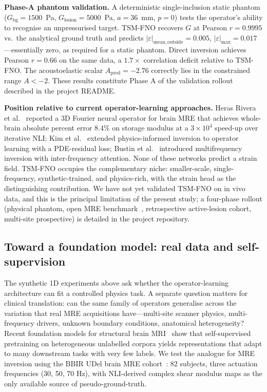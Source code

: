 \documentclass[11pt,letterpaper]{article}
\newcommand{\Gbg}{G_{\mathrm{bg}}}
\newcommand{\eps}{\varepsilon}
\begin{document}
\textbf{Phase-A phantom validation.}
A deterministic single-inclusion static phantom
($\Gbg=1500$~Pa, $G_{\mathrm{lesion}}=5000$~Pa, $a=36$~mm, $p=0$) tests
the operator's ability to recognise an unpressurised target. TSM-FNO
recovers $G$ at Pearson $r=0.9995$ vs.\ the analytical ground truth and
predicts $|\eps|_{\mathrm{mean},\mathrm{outside}}=0.005$,
$|\eps|_{\mathrm{max}}=0.017$---essentially zero, as required for a static
phantom. Direct inversion achieves Pearson $r=0.66$ on the same data, a
$1.7\times$ correlation deficit relative to TSM-FNO. The acoustoelastic
scalar $A_{\mathrm{pred}}=-2.76$ correctly lies in the constrained range
$A<-2$. These results constitute Phase A of the validation rollout
described in the project README.

\textbf{Position relative to current operator-learning approaches.}
Heras Rivera et al.~\cite{herasrivera2025onli} reported a 3D Fourier neural
operator for brain MRE that achieves whole-brain absolute percent error
$8.4\%$ on storage modulus at a $3{\times}10^{4}$ speed-up over
iterative NLI; Kim et al.~\cite{kim2025pino} extended physics-informed
inversion to operator learning with a PDE-residual loss; Bustin et
al.~\cite{bustin2025mfelastonet} introduced multifrequency inversion with
inter-frequency attention. None of these networks predict a strain field.
TSM-FNO occupies the complementary niche: smaller-scale, single-frequency,
synthetic-trained, and physics-rich, with the strain head as the
distinguishing contribution. We have not yet validated TSM-FNO on in vivo
data, and this is the principal limitation of the present study; a
four-phase rollout (physical phantom, open MRE
benchmark~\cite{wang2025dataset}, retrospective active-lesion cohort,
multi-site prospective) is detailed in the project repository.

\subsection*{Toward a foundation model: real data and self-supervision}

The synthetic 1D experiments above ask whether the operator-learning
architecture can fit a controlled physics task. A separate question
matters for clinical translation: can the same family of operators
generalise across the variation that real MRE acquisitions
have---multi-site scanner physics, multi-frequency drivers, unknown
boundary conditions, anatomical heterogeneity? Recent foundation models
for structural brain MRI~\cite{tak2026brainiac} show that
self-supervised pretraining on heterogeneous unlabelled corpora yields
representations that adapt to many downstream tasks with very few
labels. We test the analogue for MRE inversion using the BBIR UDel
brain MRE cohort~\cite{johnson2018bbir}: 82 subjects, three actuation
frequencies (30, 50, 70 Hz), with NLI-derived complex shear modulus
maps as the only available source of pseudo-ground-truth.
\end{document}
